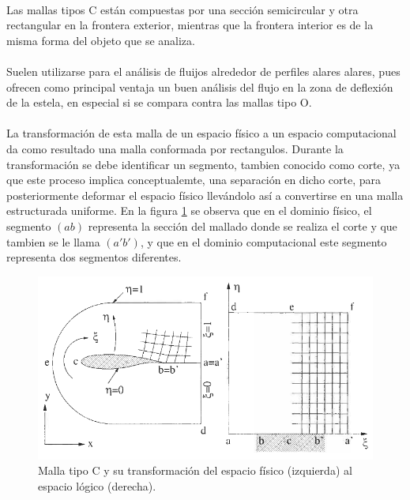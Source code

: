 \documentclass[letterpaper, openright, 12pt]{book}
\begin{document}
			\paragraph*{}
				Las mallas tipos C están compuestas por una sección semicircular y otra rectangular en la frontera exterior, mientras que la frontera interior es de la misma forma del objeto que se analiza.
			\paragraph*{}
				Suelen utilizarse para el análisis de fluijos alrededor de perfiles alares alares, pues ofrecen como principal ventaja un buen análisis del flujo en la zona de deflexión de la estela, en especial si se compara contra las mallas tipo O.\cite{best-practices-grid-generation}
			\paragraph{}
				La transformación de esta malla de un espacio físico a un espacio computacional da como resultado una malla conformada por rectangulos. Durante la transformación se debe identificar un segmento, tambien conocido como corte, ya que este proceso implica conceptualemte, una separación en dicho corte, para posteriormente deformar el espacio físico llevándolo así a convertirse en una malla estructurada uniforme. En la figura \ref{fig:malla-c} se observa que en el dominio físico, el segmento $(ab)$ representa la sección del mallado donde se realiza el corte y que tambien se le llama $(a'b')$, y que en el dominio computacional este segmento representa dos segmentos diferentes.
				\begin{figure}[htbp!]
					\centering
					\includegraphics[width=155mm]{./Imagenes/malla-c}
					\captionsetup{justification=centering, margin=2cm}
					\caption[Malla tipo C]{Malla tipo C y su transformación del espacio físico (izquierda) al espacio lógico (derecha). \cite{blazek}}
					\label{fig:malla-c}
				\end{figure}
\end{document}
